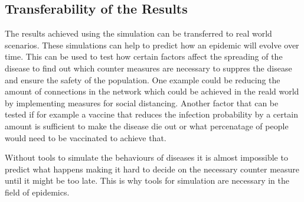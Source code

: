 \subsection{Transferability of the Results}
The results achieved using the simulation can be transferred to real world scenarios. These simulations can help to predict how an epidemic will evolve over time. This can be used to test how certain factors affect the spreading of the disease to find out which counter measures are necessary to suppres the disease and ensure the safety of the population. One example could be reducing the amount of connections in the network which could be achieved in the reald world by implementing measures for social distancing. Another factor that can be tested if for example a vaccine that reduces the infection probability by a certain amount is sufficient to make the disease die out or what percenatage of people would need to be vaccinated to achieve that.

Without tools to simulate the behaviours of diseases it is almost impossible to predict what happens making it hard to decide on the necessary counter measure until it might be too late. This is why tools for simulation are necessary in the field of epidemics.
